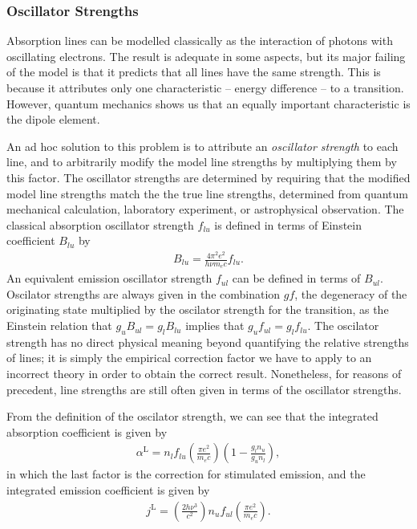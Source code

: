 \subsubsection{Oscillator Strengths}

Absorption lines can be modelled classically as the
interaction of photons with oscillating electrons. The
result is adequate in some aspects, but its major failing of
the model is that it predicts that all lines have the same
strength. This is because it attributes only one characteristic -- energy
difference -- to a transition. However, quantum mechanics shows us that an equally important characteristic is the dipole element.

An ad hoc solution to this problem is to attribute an
\emph{oscillator strength} to each line, and to arbitrarily
modify the model line strengths by multiplying them by this
factor. The oscillator strengths are determined by requiring
that the modified model line strengths match the the true
line strengths, determined from quantum mechanical
calculation, laboratory experiment, or astrophysical
observation. The classical absorption oscillator strength
$f_{lu}$ is defined in terms of Einstein coefficient
$B_{lu}$ by
\begin{align}
B_{lu} = \frac{4\pi^2 e^2}{h\nu m_e c} f_{lu}.
\end{align}
An equivalent emission oscillator strength $f_{ul}$ can be
defined in terms of $B_{ul}$. Oscilator strengths are always
given in the combination $gf$, the degeneracy of the
originating state multiplied by the oscilator strength for
the transition, as the Einstein relation that $g_u B_{ul} =
g_l B_{lu}$ implies that $g_u f_{ul} = g_l f_{lu}$. The
oscilator strength has no direct physical meaning beyond
quantifying the relative strengths of lines; it is simply
the empirical correction factor we have to apply to an
incorrect theory in order to obtain the correct result.
Nonetheless, for reasons of precedent, line strengths are
still often given in terms of the oscillator strengths.

From the definition of the oscilator strength, we can see
that the integrated absorption coefficient is given by
\begin{align}
\alpha^\mathrm{L} =  n_l f_{lu}\left(\frac{\pi e^2}{m_e c}\right)\left(1 - \frac{g_l n_u}{g_u n_l}\right),
\end{align}
in which the last factor is the correction for stimulated
emission, and the integrated emission coefficient is given
by
\begin{align}
j^\mathrm{L} = \left(\frac{2h\nu^3}{c^2}\right)n_u
f_{ul}\left(\frac{\pi e^2}{m_e c}\right).
\end{align}

